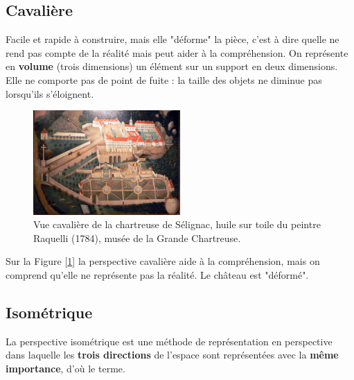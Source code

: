 \documentclass[
	11pt, %
	fleqn, %
	a4paper, %
]{LegrandOrangeBook}
\begin{document}
\subsection{Cavalière}
Facile et rapide à construire, mais elle "déforme" la pièce, c'est à dire quelle ne rend pas compte de la réalité mais peut aider à la compréhension. On représente en \textbf{volume} (trois dimensions) un élément sur un support en deux dimensions. Elle ne comporte pas de point de fuite : la taille des objets ne diminue pas lorsqu'ils s'éloignent.

\begin{figure}[H] %
	\centering %
	\includegraphics[width=0.5\textwidth]{Images/musee.jpg} %
	\caption{Vue cavalière de la chartreuse de Sélignac, huile sur toile du peintre Raquelli (1784), musée de la Grande Chartreuse.}
	\label{musee} %
\end{figure}

Sur la Figure [\ref{musee}] la perspective cavalière aide à la compréhension, mais on comprend qu'elle ne représente pas la réalité. Le château est "déformé".

\subsection{Isométrique}
La perspective isométrique est une méthode de représentation en perspective dans laquelle les \textbf{trois directions} de l'espace sont représentées avec la \textbf{même importance}, d'où le terme.
\end{document}
